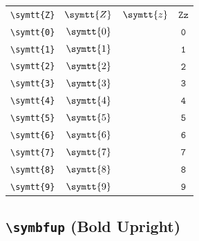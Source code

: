 \documentclass[12pt,a4paper]{article}
\begin{document}
\begin{longtable}{|c|c|c|c|}
\verb|\symtt{Z}| & $\symtt{Z}$ & $\symtt{z}$ & $ 𝚉 𝚣 $ \\
\verb|\symtt{0}| & $\symtt{0}$ & & $ 𝟶 $ \\
\verb|\symtt{1}| & $\symtt{1}$ & & $ 𝟷 $ \\
\verb|\symtt{2}| & $\symtt{2}$ & & $ 𝟸 $ \\
\verb|\symtt{3}| & $\symtt{3}$ & & $ 𝟹 $ \\
\verb|\symtt{4}| & $\symtt{4}$ & & $ 𝟺 $ \\
\verb|\symtt{5}| & $\symtt{5}$ & & $ 𝟻 $ \\
\verb|\symtt{6}| & $\symtt{6}$ & & $ 𝟼 $ \\
\verb|\symtt{7}| & $\symtt{7}$ & & $ 𝟽 $ \\
\verb|\symtt{8}| & $\symtt{8}$ & & $ 𝟾 $ \\
\verb|\symtt{9}| & $\symtt{9}$ & & $ 𝟿 $ \\
\hline
\end{longtable}

\newpage

\subsection*{\texttt{\textbackslash{}symbfup} (Bold Upright)}
\end{document}
